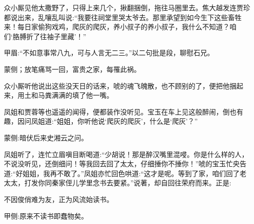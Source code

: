 \begin{parag}
    众小厮见他太撒野了，只得上来几个，揪翻捆倒，拖往马圈里去。焦大越发连贾珍都说出来，乱嚷乱叫说:“我要往祠堂里哭太爷去。那里承望到如今生下这些畜牲来！每日家偷狗戏鸡，爬灰的爬灰，养小叔子的养小叔子，我什么不知道？咱们‘胳膊折了往袖子里藏’！”\begin{note}甲眉:“不如意事常八九，可与人言无二三。”以二句批是段，聊慰石兄。\end{note}\begin{note}蒙侧；放笔痛骂一回，富贵之家，每罹此祸。\end{note}众小厮听他说出这些没天日的话来，唬的魂飞魄散，也不顾别的了，便把他捆起来，用土和马粪满满的填了他一嘴。
\end{parag}


\begin{parag}
    凤姐和贾蓉等也遥遥的闻得，便都装作没听见。宝玉在车上见这般醉闹，倒也有趣，因问凤姐道:“姐姐，你听他说‘爬灰的爬灰’，什么是‘爬灰’？”\begin{note}蒙侧:暗伏后来史湘云之问。\end{note}凤姐听了，连忙立眉嗔目断喝道:“少胡说！那是醉汉嘴里混唚。你是什么样的人，不说没听见，还倒细问！等我回去回了太太，仔细捶你不捶你！”唬的宝玉忙央告道:“好姐姐，我再不敢了。”凤姐亦忙回色哄道:“这才是呢。等到了家，咱们回了老太太，打发你同秦家侄儿学里念书去要紧。”说著，却自回往荣府而来。正是:
\end{parag}


\begin{poem}
    \begin{pl} 不因俊俏难为友，正为风流始读书。\end{pl}
    \begin{note}甲侧:原来不读书即蠢物矣。\end{note}
\end{poem}
